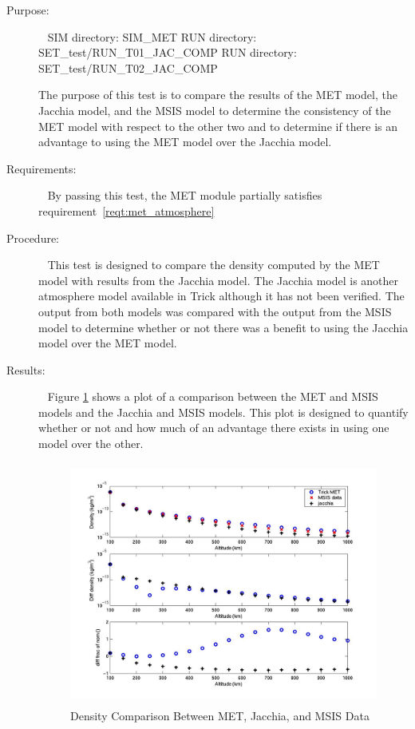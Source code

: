 \label{test:met_JAC}
\begin{description}
\item[Purpose:] \ \newline
SIM directory: SIM\_MET \newline
RUN directory: SET\_test/RUN\_T01\_JAC\_COMP \newline
RUN directory: SET\_test/RUN\_T02\_JAC\_COMP

The purpose of this test is to compare the results of the MET model, the
Jacchia model, and the MSIS model to determine the consistency of the
MET model with respect to the other two and to determine if there is an
advantage to using the MET model over the Jacchia model.

\item[Requirements:] \ \newline
By passing this test, the MET module partially satisfies
requirement~\ref{reqt:met_atmosphere}
\item[Procedure:]\ \newline
This test is designed to compare the density computed
by the MET model with results from the Jacchia model.  The Jacchia model is
another atmosphere model available in Trick although it has not been verified.
The output from both models was compared with the output from the MSIS model
to determine whether or not there was a benefit to using the Jacchia model over
the MET model.
\item[Results:]\ \newline
Figure \ref{met_jac_global} shows a plot of a comparison between the MET and
MSIS models and the Jacchia and MSIS models.  This plot is designed to quantify
whether or not and how much of an advantage there exists in using one model
over the other.

\begin{figure}[H]
\begin{center}
\includegraphics[height=80mm]{pics/MET_JAC_T01_temperature.jpg}
\caption{Density Comparison Between MET, Jacchia, and MSIS Data}
\label{met_jac_global}
\end{center}
\end{figure}


\end{description}
